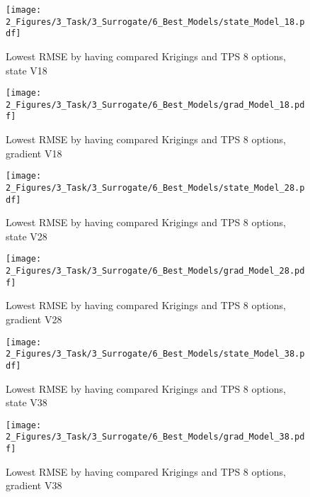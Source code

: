 \begin{figure}[!h]
    \begin{minipage}[h]{0.46\textwidth}
        \centering
        \texttt{[image: 2\_Figures/3\_Task/3\_Surrogate/6\_Best\_Models/state\_Model\_18.pdf]}
        \caption{Lowest RMSE by having compared Krigings and TPS 8 options, state V18}
        \label{fig_113}    
    \end{minipage}
    \hfill
    \begin{minipage}{0.46\textwidth}
        \centering
        \texttt{[image: 2\_Figures/3\_Task/3\_Surrogate/6\_Best\_Models/grad\_Model\_18.pdf]}
        \caption{Lowest RMSE by having compared Krigings and TPS 8 options, gradient V18}
        \label{fig_114}    
    \end{minipage}
    \vspace{0.5cm}
    \begin{minipage}[h]{0.46\textwidth}
        \centering
        \texttt{[image: 2\_Figures/3\_Task/3\_Surrogate/6\_Best\_Models/state\_Model\_28.pdf]}
        \caption{Lowest RMSE by having compared Krigings and TPS 8 options, state V28}
        \label{fig_115}    
    \end{minipage}
    \hfill
    \begin{minipage}{0.46\textwidth}
        \centering
        \texttt{[image: 2\_Figures/3\_Task/3\_Surrogate/6\_Best\_Models/grad\_Model\_28.pdf]}
        \caption{Lowest RMSE by having compared Krigings and TPS 8 options, gradient V28}
        \label{fig_116}    
    \end{minipage}
    \vspace{0.5cm}
    \begin{minipage}[h]{0.46\textwidth}
        \centering
        \texttt{[image: 2\_Figures/3\_Task/3\_Surrogate/6\_Best\_Models/state\_Model\_38.pdf]}
        \caption{Lowest RMSE by having compared Krigings and TPS 8 options, state V38}
        \label{fig_117}    
    \end{minipage}
    \hfill
    \begin{minipage}{0.46\textwidth}
        \centering
        \texttt{[image: 2\_Figures/3\_Task/3\_Surrogate/6\_Best\_Models/grad\_Model\_38.pdf]}
        \caption{Lowest RMSE by having compared Krigings and TPS 8 options, gradient V38}
        \label{fig_118}    
    \end{minipage}
\end{figure} 
